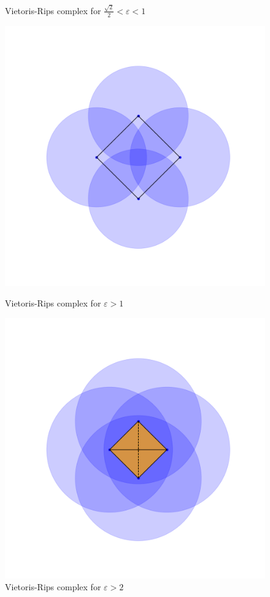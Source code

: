 \begin{example}
\begin{figure}[!htb]
  \caption*{
  Vietoris-Rips complex for $\frac{\sqrt{2}}{2}<\varepsilon<1$
  }
  \label{fig:awesome_image2}
\endminipage\hfill
{}%
  \includegraphics[width=\linewidth]{imgs/vr_example_1_1_2.png}
  \caption*{
  Vietoris-Rips complex for $\varepsilon>1$
  }
  \label{fig:awesome_image3}
\endminipage
{}%
  \includegraphics[width=\linewidth]{imgs/vr_example_1_2_2.png}
  \caption*{
  Vietoris-Rips complex for $\varepsilon>2$
  }
  \label{fig:awesome_image3}
\endminipage
\end{figure}

\end{example}

